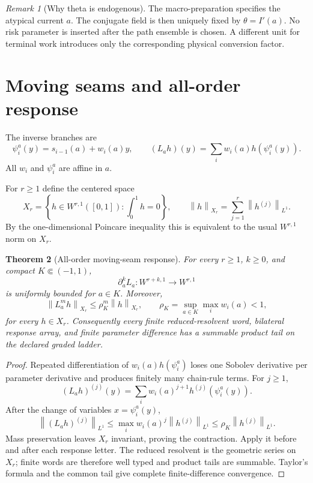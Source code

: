 \documentclass[11pt,reqno]{amsart}
\newtheorem{theorem}{Theorem}[section]
\theoremstyle{remark}
\newtheorem{remark}[theorem]{Remark}
\newcommand{\norm}[1]{\left\lVert #1\right\rVert}
\begin{document}
\begin{remark}[Why theta is endogenous]
The macro-preparation specifies the atypical current $a$.  The conjugate field
is then uniquely fixed by $\theta=I'(a)$.  No risk parameter is inserted after
the path ensemble is chosen.  A different unit for terminal work introduces
only the corresponding physical conversion factor.
\end{remark}

\section{Moving seams and all-order response}
The inverse branches are
\[
 \psi_i^a(y)=s_{i-1}(a)+w_i(a)y,
 \qquad
 (L_ah)(y)=\sum_iw_i(a)h(\psi_i^a(y)).
\]
All $w_i$ and $\psi_i^a$ are affine in $a$.

For $r\ge1$ define the centered space
\[
 X_r=\left\{h\in W^{r,1}([0,1]):\int_0^1h=0\right\},
 \qquad
 \norm h_{X_r}=\sum_{j=1}^r\norm{h^{(j)}}_{L^1}.
\]
By the one-dimensional Poincare inequality this is equivalent to the usual
$W^{r,1}$ norm on $X_r$.

\begin{theorem}[All-order moving-seam response]\label{thm:response}
For every $r\ge1$, $k\ge0$, and compact $K\Subset(-1,1)$,
\[
 \partial_a^kL_a:W^{r+k,1}\longrightarrow W^{r,1}
\]
is uniformly bounded for $a\in K$.  Moreover,
\[
 \norm{L_a^mh}_{X_r}
 \le \rho_K^m\norm h_{X_r},
 \qquad
 \rho_K=\sup_{a\in K}\max_iw_i(a)<1,
\]
for every $h\in X_r$.  Consequently every finite reduced-resolvent word,
bilateral response array, and finite parameter difference has a summable
product tail on the declared graded ladder.
\end{theorem}
\begin{proof}
Repeated differentiation of $w_i(a)h(\psi_i^a)$ loses one Sobolev derivative
per parameter derivative and produces finitely many chain-rule terms.  For
$j\ge1$,
\[
 (L_ah)^{(j)}(y)=\sum_iw_i(a)^{j+1}h^{(j)}(\psi_i^a(y)).
\]
After the change of variables $x=\psi_i^a(y)$,
\[
 \norm{(L_ah)^{(j)}}_{L^1}
 \le \max_iw_i(a)^j\norm{h^{(j)}}_{L^1}
 \le \rho_K\norm{h^{(j)}}_{L^1}.
\]
Mass preservation leaves $X_r$ invariant, proving the contraction.  Apply it
before and after each response letter.  The reduced resolvent is the geometric
series on $X_r$; finite words are therefore well typed and product tails are
summable.  Taylor's formula and the common tail give complete
finite-difference convergence.
\end{proof}
\end{document}
